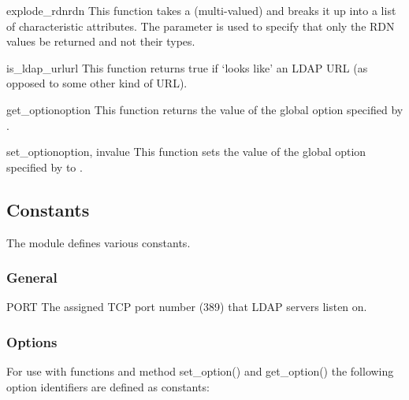 \begin{funcdesc}{explode_rdn}{rdn } %
  This function takes a (multi-valued)  and breaks it up
  into a list of characteristic attributes. The
   parameter is used to specify that only the RDN values be 
  returned and not their types.
\end{funcdesc}

\begin{funcdesc}{is_ldap_url}{url} %
  This function returns true if  `looks like' an LDAP URL 
  (as opposed to some other kind of URL). 
  \begin{seealso}
  \end{seealso}
\end{funcdesc}

\begin{funcdesc}{get_option}{option} %
  This function returns the value of the global option
  specified by .
\end{funcdesc}

\begin{funcdesc}{set_option}{option, invalue} %
  This function sets the value of the global option
  specified by  to .
\end{funcdesc}



\subsection{Constants}

The module defines various constants.

\subsubsection{General}

\begin{datadesc}{PORT}
  The assigned TCP port number (389) that LDAP servers listen on.
\end{datadesc}

\subsubsection{Options}

For use with functions and method set_option() and get_option() the
following option identifiers are defined as constants:

